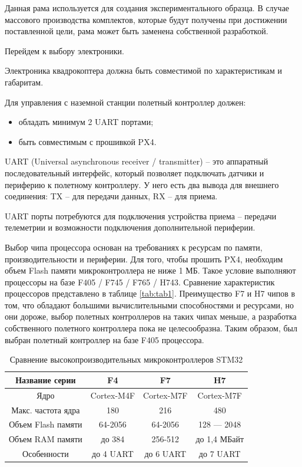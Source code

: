 Данная рама используется для создания экспериментального образца. В случае массового производства комплектов, которые будут получены при достижении поставленной цели, рама может быть заменена собственной разработкой.

Перейдем к выбору электроники.

Электроника квадрокоптера должна быть совместимой по характеристикам и габаритам. 

Для управления с наземной станции полетный контроллер должен:
\begin{itemize}
	\item обладать минимум 2 UART портами;
	\item быть совместимым с прошивкой PX4.
\end{itemize}

UART (Universal asynchronous receiver / transmitter) -- это аппаратный последовательный интерфейс, который позволяет подключать датчики и периферию к полетному контроллеру. У него есть два вывода для внешнего соединения: TX -- для передачи данных, RX -- для приема.

UART порты потребуются для подключения устройства приема -- передачи телеметрии и возможности подключения дополнительной периферии.

Выбор чипа процессора основан на требованиях к ресурсам по памяти, производительности и периферии. Для того, чтобы прошить PX4, необходим объем Flash памяти микроконтроллера не ниже 1 МБ. Такое условие выполняют процессоры на базе F405 / F745 / F765 / H743. Сравнение характеристик процессоров представлено в таблице \ref{tab:tab1}. Преимущество F7 и H7 чипов в том, что обладают большими вычислительными способностями и ресурсами, но они дороже, выбор полетных контроллеров на таких чипах меньше, а разработка собственного полетного контроллера пока не целесообразна. Таким образом, был выбран полетный контроллер на базе F405 процессора.


\begin{table}[h]
	\caption{Сравнение высокопроизводительных микроконтроллеров STM32} \label{tab:tab1}
	\centering
	\begin{tabular}{ | c | c | c | c |}
		\hline
		Название серии & F4 \cite{stm32f4} & F7 \cite{stm32f7} & H7 \cite{stm32h7}    \\ \hline
		Ядро & Cortex-M4F & Cortex-M7F  & Cortex-M7F   \\ \hline
		Макс. частота ядра & 180 & 216  & 480   \\ \hline
		Объем Flash памяти & 64-2056 & 64-2056  & 128 — 2048   \\ \hline
		Объем RAM памяти  & до 384 & 256-512  & до 1,4 МБайт   \\ \hline
		Особенности & до 4 UART & до 6 UART  & до 7 UART   \\
		\hline
	\end{tabular}
	\label{table:satellites}
\end{table}

